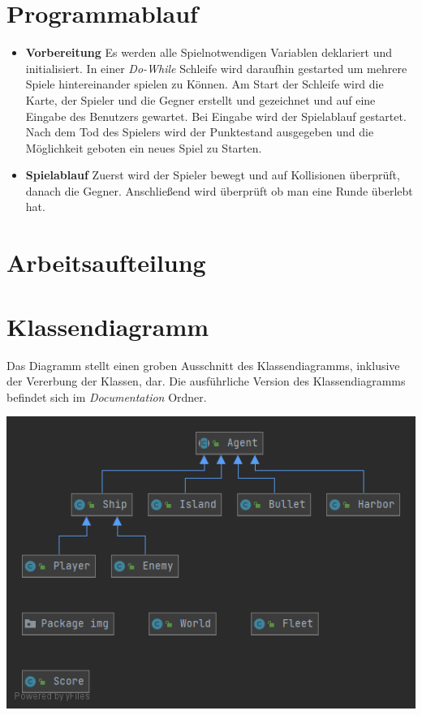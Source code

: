 \documentclass{article}
\begin{document}
\section{Programmablauf}
\begin{itemize}
    \item \textbf{Vorbereitung}
        \newline
        Es werden alle Spielnotwendigen Variablen deklariert und initialisiert. In einer \textit{Do-While} Schleife wird daraufhin gestarted um mehrere Spiele hintereinander spielen zu Können. Am Start der Schleife wird die Karte, der Spieler und die Gegner erstellt und gezeichnet und auf eine Eingabe des Benutzers gewartet. Bei Eingabe wird der Spielablauf gestartet. Nach dem Tod des Spielers wird der Punktestand ausgegeben und die Möglichkeit geboten ein neues Spiel zu Starten.
    \item \textbf{Spielablauf}
        \newline
        Zuerst wird der Spieler bewegt und auf Kollisionen überprüft, danach die Gegner. Anschließend wird überprüft ob man eine Runde überlebt hat.
\end{itemize}
\newpage
\section{Arbeitsaufteilung}

\newpage
\section{Klassendiagramm}
Das Diagramm stellt einen groben Ausschnitt des Klassendiagramms, inklusive der Vererbung der Klassen, dar. Die ausführliche Version des Klassendiagramms befindet sich im \textit{Documentation} Ordner.
\newline

\includegraphics[width=\textwidth,height=\textheight,keepaspectratio]{./images/Rough_UML.png}
\newpage
\end{document}
